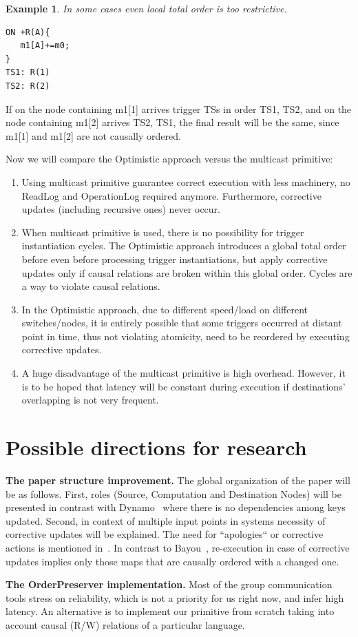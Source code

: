 \documentclass{sig-semester}
\newtheorem{example}[theorem]{Example}
\begin{document}
\begin{example} \em
\label{ex:allowedCyclic}
In some cases even local total order is too restrictive.
\begin{verbatim}
ON +R(A){
   m1[A]+=m0;
}
TS1: R(1)
TS2: R(2)
\end{verbatim}
\end{example}
If on the node containing m1[1] arrives trigger TSs in order TS1, TS2, and on the node containing m1[2] arrives TS2, TS1, the final result will be the same, since m1[1] and m1[2] are not causally ordered.

Now we will compare the Optimistic approach versus the multicast primitive:
\begin{enumerate}[(1)]
 \item Using multicast primitive guarantee correct execution with less machinery, no ReadLog and OperationLog required anymore. Furthermore, corrective updates (including recursive ones) never occur.
 \item When multicast primitive is used, there is no possibility for trigger instantiation cycles. The Optimistic approach introduces a global total order before even before processing trigger instantiations, but apply corrective updates only if causal relations are broken within this global order. Cycles are a way to violate causal relations.
 \item In the Optimistic approach, due to different speed/load on different switches/nodes, it is entirely possible that some triggers occurred at distant point in time, thus not violating atomicity, need to be reordered by executing corrective updates. 
 \item A huge disadvantage of the multicast primitive is high overhead. However, it is to be hoped that latency will be constant during execution if destinations' overlapping is not very frequent.
\end{enumerate}

\section{Possible directions for research}
\vspace{2mm}

\textbf{The paper structure improvement.} The global organization of the paper will be as follows. First, roles (Source, Computation and Destination Nodes) will be presented in contrast with Dynamo~\cite{decandia07} where there is no dependencies among keys updated. Second, in context of multiple input points in systems necessity of corrective updates will be explained. The need for ``apologies`` or corrective actions is mentioned in~\cite{alvaro11}. In contrast to Bayou~\cite{petersen97}, re-execution in case of corrective updates implies only those maps that are causally ordered with a changed one.

\textbf{The OrderPreserver implementation.}
Most of the group communication tools stress on reliability, which is not a priority for us right now, and infer high latency. An alternative is to implement our primitive from scratch taking into account causal (R/W) relations of a particular language.
 
{


}

\newpage
\end{document}
